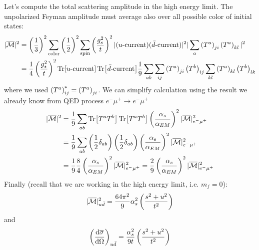 \documentclass[TheoreticalPhy_ModB.tex]{subfiles}
\begin{document}
Let's compute the total scattering amplitude in the high energy limit. The unpolarized Feyman amplitude must average also over all possible color of initial states:
\begin{align*}
\vert\overline{\mathcal M} \vert^2
&=\left(\frac13\right)^2\sum_{\text{color}}\left(\frac12\right)^2\sum_{\text{spin}}\left(\frac{g_s^2}t\right)^2\vert(\text{$u$-current})(\text{$\bar d$-current})\vert^2\vert\sum_a\left(T^a\right)_{ji}\left(T^a\right)_{kl}\vert^2\\
&=\frac14\left(\frac{g_s^2}t\right)^2\Tr[\text{$u$-current}]\Tr[\text{$\bar d$-current}]\frac19\sum_{ab}\sum_{ij}\left(T^a\right)_{ji}\left(T^b\right)_{ij}\sum_{kl}\left(T^a\right)_{kl}\left(T^b\right)_{lk}
\end{align*}
where we used $\left(T^a\right)_{ij}^*=\left(T^a\right)_{ji}$. 
We can simplify calculation using the result we already know from QED process $e^-\mu^+\rightarrow e^-\mu^+$
\begin{align*}
\vert\overline{\mathcal M} \vert^2
&=\frac19\sum_{ab}\Tr[T^aT^b]\Tr[T^aT^b]\left(\frac{\alpha_s}{\alpha_{EM}}\right)^2\vert\overline{\mathcal M} \vert^2_{e^-\mu^+}\\
&=\frac19\sum_{ab}\left(\frac12\delta_{ab}\right)\left(\frac12\delta_{ab}\right)\left(\frac{\alpha_s}{\alpha_{EM}}\right)^2\vert\overline{\mathcal M} \vert^2_{e^-\mu^+}\\
&=\frac19\frac84\left(\frac{\alpha_s}{\alpha_{EM}}\right)^2\vert\overline{\mathcal M} \vert^2_{e^-\mu^+}
=\frac29\left(\frac{\alpha_s}{\alpha_{EM}}\right)^2\vert\overline{\mathcal M} \vert^2_{e^-\mu^+}
\end{align*}
Finally (recall that we are working in the high energy limit, i.e. $m_f=0$):
\[\vert\overline{\mathcal M} \vert^2_{u\bar d}=\frac{64\pi^2}9\alpha_s^2\left(\frac{s^2+u^2}{t^2}\right)\]
and
\[{\left(\frac{\textup{d}\overline\sigma}{\textup{d}\Omega}\right)}_{u\bar d}=\frac{\alpha_s^2}{9t}\left(\frac{s^2+u^2}{t^2}\right)\]
\end{document}

